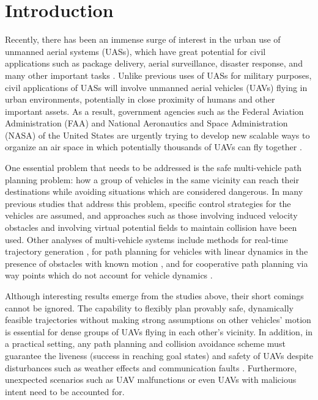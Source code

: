\section{Introduction}
Recently, there has been an immense surge of interest in the urban use of unmanned aerial systems (UASs), which have great potential for civil applications such as package delivery, aerial surveillance, disaster response, and many other important tasks \cite{Tice91, Debusk10, Amazon16, AUVSI16, BBC16}. Unlike previous uses of UASs for military purposes, civil applications of UASs will involve unmanned aerial vehicles (UAVs) flying in urban environments, potentially in close proximity of humans and other important assets. As a result, government agencies such as the Federal Aviation Administration (FAA) and National Aeronautics and Space Administration (NASA) of the United States are urgently trying to develop new scalable ways to organize an air space in which potentially thousands of UAVs can fly together \cite{FAA13, NASA16, Kopardekar16}.

One essential problem that needs to be addressed is the safe multi-vehicle path planning problem: how a group of vehicles in the same vicinity can reach their destinations while avoiding situations which are considered dangerous. In many previous studies that address this problem, specific control strategies for the vehicles are assumed, and approaches such as those involving induced velocity obstacles \cite{Fiorini98, Chasparis05, Vandenberg08} and involving virtual potential fields to maintain collision \cite{Olfati-Saber2002, Chuang07} have been used. Other analyses of multi-vehicle systems include methods for real-time trajectory generation \cite{Feng-LiLian2002}, for path planning for vehicles with linear dynamics in the presence of obstacles with known motion \cite{Ahmadzadeh2009}, and for cooperative path planning via way points which do not account for vehicle dynamics \cite{Bellingham}.

Although interesting results emerge from the studies above, their short comings cannot be ignored. The capability to flexibly plan provably safe, dynamically feasible trajectories without making strong assumptions on other vehicles' motion is essential for dense groups of UAVs flying in each other's vicinity. In addition, in a practical setting, any path planning and collision avoidance scheme must guarantee the liveness (success in reaching goal states) and safety of UAVs despite disturbances such as weather effects and communication faults \cite{Kopardekar16}. Furthermore, unexpected scenarios such as UAV malfunctions or even UAVs with malicious intent need to be accounted for.

